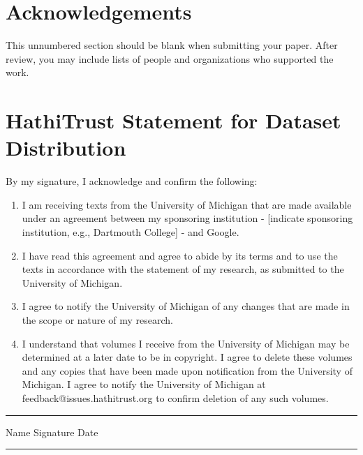 \documentclass{anthology-ch}         %
\begin{document}
\section*{Acknowledgements}

This unnumbered section should be blank when submitting your paper. After review, you may include lists of people and organizations who supported the work.

\printbibliography

\appendix

\section{HathiTrust Statement for Dataset Distribution} \label{appdx:first}

By my signature, I acknowledge and confirm the following:

\begin{enumerate}
    \item  I am receiving texts from the University of Michigan that are made available under an agreement between my sponsoring institution - [indicate sponsoring institution, e.g., Dartmouth College] - and Google.
    \item  I have read this agreement and agree to abide by its terms and to use the texts in accordance with the statement of my research, as submitted to the University of Michigan.
    \item  I agree to notify the University of Michigan of any changes that are made in the scope or nature of my research.
    \item  I understand that volumes I receive from the University of Michigan may be determined at a later date to be in copyright. I agree to delete these volumes and any copies that have been made upon notification from the University of Michigan. I agree to notify the University of Michigan at feedback@issues.hathitrust.org to confirm deletion of any such volumes.
\end{enumerate}

\rule{\textwidth}{0.5pt}

Name \hspace{0.3\textwidth} Signature \hspace{0.3\textwidth} Date

\rule{\textwidth}{0.5pt}
\end{document}
